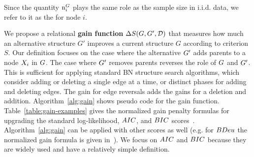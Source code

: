 \documentclass{article}
\begin{document}
Since the quantity $\mathrm{n}_{i}^{G}$ plays the same role as the sample size in i.i.d. data, we refer to it as the  for node $i$.  
%
%
%

We propose a relational \textbf{gain function} $\Delta S(G,G',\mathcal{D})$ that measures how much an alternative structure $G'$ improves a current structure $G$ according to criterion $S$. Our definition focuses on the case where the alternative $G'$ adds parents to a node $X_{i}$ in $G$. The case where $G'$ removes parents reverses the role of $G$ and $G'$. This is sufficient for applying standard BN structure search algorithms, which consider adding or deleting a single edge at a time, or distinct phases for adding and deleting edges. %
The gain for edge reversals adds the gains for a deletion and addition. Algorithm~\ref{alg:gain} shows pseudo code for the gain function.
Table~\ref{table:gain-examples} gives the normalized gain penalty formulas for upgrading the standard log-likelihood, $AIC$, and $BIC$ scores~\cite{bouckaert95:_bayes}. 
Algorithm~\ref{alg:gain} can be applied with other scores as well (e.g. for $BDeu$ the normalized gain formula is given in~\cite[Section~3.1.3]{gholami2016upgrading}). We focus on $AIC$ and $BIC$ because they are widely used and have a relatively simple definition.
 
\end{document}
